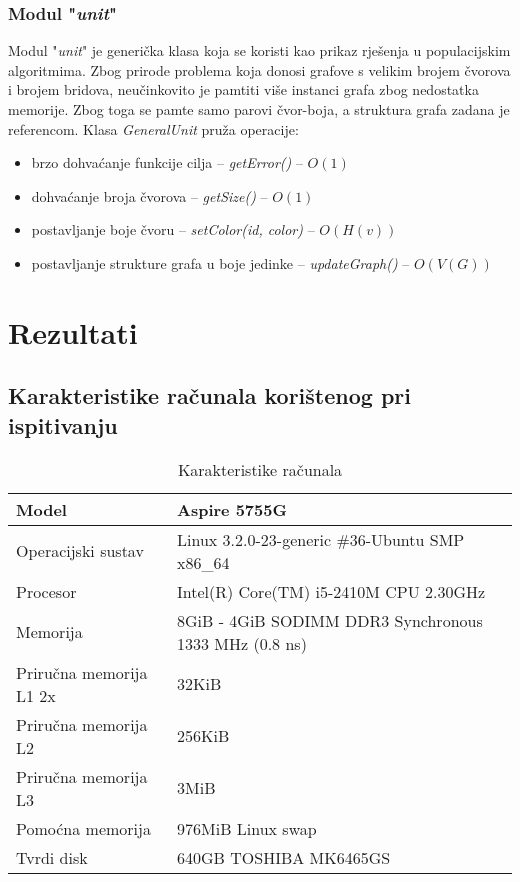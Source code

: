 \documentclass[times, utf8, diplomski, numeric]{fer}
\begin{document}
\subsection{Modul "\emph{unit}"}

Modul "\emph{unit}" je generička klasa koja se koristi kao prikaz rješenja u populacijskim algoritmima. Zbog prirode problema koja donosi grafove s velikim brojem čvorova i brojem bridova, neučinkovito je pamtiti više instanci grafa zbog nedostatka memorije. Zbog toga se pamte samo parovi čvor-boja, a struktura grafa zadana je referencom. Klasa \emph{GeneralUnit} pruža operacije: 

\begin{itemize}
	\item brzo dohvaćanje funkcije cilja -- \emph{getError()} -- $O(1)$
	\item dohvaćanje broja čvorova -- \emph{getSize()} -- $O(1)$
	\item postavljanje boje čvoru -- \emph{setColor(id, color)} -- $O(H(v))$
	\item postavljanje strukture grafa u boje jedinke -- \emph{updateGraph()} -- $O(V(G))$
\end{itemize}

\chapter{Rezultati}

\section{Karakteristike računala korištenog pri ispitivanju}

\begin{table}[htb]
	\caption{Karakteristike računala}
	\label{tbl:karakteristike-PC}
	\centering
	\begin{tabular}{|l|l|} \hline
		Model & Aspire 5755G \\ \hline
		Operacijski sustav & Linux 3.2.0-23-generic \#36-Ubuntu SMP x86\_64 \\ \hline
		Procesor & Intel(R) Core(TM) i5-2410M CPU \@ 2.30GHz \\ \hline
		Memorija & 8GiB - 4GiB SODIMM DDR3 Synchronous 1333 MHz (0.8 ns) \\ \hline
		Priručna memorija L1 2x & 32KiB \\ \hline
		Priručna memorija L2 & 256KiB \\ \hline
		Priručna memorija L3 & 3MiB \\ \hline
		Pomoćna memorija & 976MiB Linux swap \\ \hline
		Tvrdi disk & 640GB TOSHIBA MK6465GS \\ \hline
	\end{tabular}
\end{table}
\end{document}
